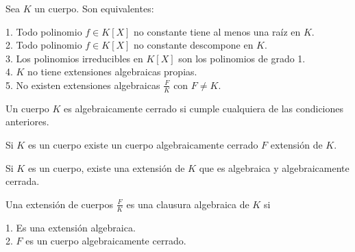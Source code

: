 

\begin{lemma}
	Sea $K$ un cuerpo. Son equivalentes:
	
	1. Todo polinomio $f  \in K[X]$ no constante tiene al menos una raíz en $K$.\\
	2. Todo polinomio $f  \in K[X]$ no constante descompone en $K$. \\
	3. Los polinomios irreducibles en $K[X]$ son los polinomios de grado 1. \\
	4. $K$ no tiene extensiones algebraicas propias. \\
	5. No existen extensiones algebraicas $\frac{F}{K}$ con $F \neq K$. 
\end{lemma}


\begin{definition}
	Un cuerpo $K$ es algebraicamente cerrado si cumple cualquiera de las condiciones anteriores. 
\end{definition}

\begin{theorem}
	Si $K$ es un cuerpo existe un cuerpo algebraicamente cerrado $F$ extensión de $K$. 
\end{theorem}

\begin{corollary}
	Si $K$ es un cuerpo, existe una extensión de $K$ que es algebraica y algebraicamente cerrada. 	
\end{corollary}

\begin{definition}
	Una extensión de cuerpos $\frac{F}{K}$ es una clausura algebraica de $K$ si 
	
	1. Es una extensión algebraica. \\
	2. $F$ es un cuerpo algebraicamente cerrado. 
\end{definition}



